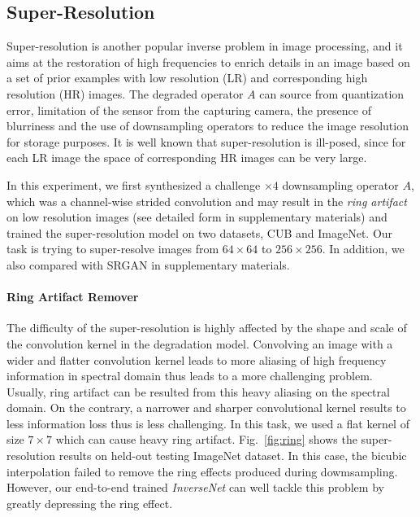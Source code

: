 \documentclass[10pt,twocolumn,letterpaper]{article}
\begin{document}
\subsection{Super-Resolution}

Super-resolution is another popular inverse problem in image processing, and it aims at the restoration of high frequencies to enrich details in an image based on a set of prior examples with low resolution (LR) and corresponding high resolution (HR) images. 
The degraded operator $A$ can source from quantization error, limitation of the sensor from the capturing camera, the presence of blurriness and the use of downsampling operators to reduce the image resolution for storage purposes. 
It is well known that super-resolution is ill-posed, since for each LR image the space of corresponding HR images can be very large. 

In this experiment, we first synthesized a challenge $\times 4$ downsampling operator $A$, which was a channel-wise strided convolution and may result in the \textit{ring artifact} on low resolution images (see detailed form in supplementary materials) and trained the super-resolution model on two datasets, CUB and ImageNet. Our task is trying to super-resolve images from $64\times 64$ to $256 \times 256$.  
In addition, we also compared with SRGAN \cite{ledig2016photo} in supplementary materials. 

\paragraph{Ring Artifact Remover} The difficulty of the super-resolution is highly affected by the shape and 
scale of the convolution kernel in the degradation model. Convolving an image with a wider and flatter 
convolution kernel leads to more aliasing of high frequency information in spectral domain thus leads to 
a more challenging problem. Usually, ring artifact can be resulted from this heavy aliasing on the spectral
domain. On the contrary, a narrower and sharper convolutional kernel results to less
information loss thus is less challenging. In this task, we used a flat kernel of size $7 \times 7$ 
which can cause heavy ring artifact. Fig.~\ref{fig:ring} shows the super-resolution results on held-out testing ImageNet dataset. 
In this case, the bicubic interpolation failed to remove the ring effects produced during dowmsampling.
However, our end-to-end trained \emph{InverseNet} can well tackle this problem by greatly depressing the ring effect.
\end{document}
